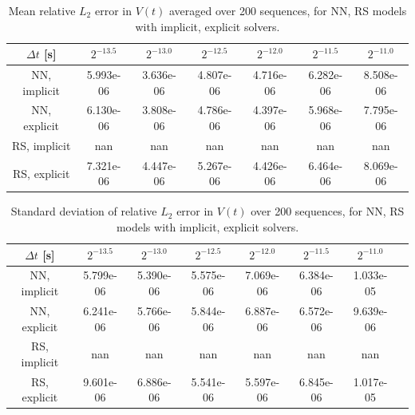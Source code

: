 \begin{table}[H]
    \centering
    \begin{tabular}{ccccccc}
        \hline
        $\Delta t$ [s] & $2^{-13.5}$ & $2^{-13.0}$ & $2^{-12.5}$ & $2^{-12.0}$ & $2^{-11.5}$ & $2^{-11.0}$ \\
        \hline
        NN, implicit & 5.993e-06 & 3.636e-06 & 4.807e-06 & 4.716e-06 & 6.282e-06 & 8.508e-06 \\
        NN, explicit & 6.130e-06 & 3.808e-06 & 4.786e-06 & 4.397e-06 & 5.968e-06 & 7.795e-06 \\
        RS, implicit & nan & nan & nan & nan & nan & nan \\
        RS, explicit & 7.321e-06 & 4.447e-06 & 5.267e-06 & 4.426e-06 & 6.464e-06 & 8.069e-06 \\
        \hline
    \end{tabular}
    \caption{Mean relative $L_2$ error in $V(t)$ averaged over 200 sequences, 
    for NN, RS models with implicit, explicit solvers.}
    \label{tab:MeanL2ErrorSpringSliderRsVsNNRespective}
\end{table}

\begin{table}[H]
    \centering
    \begin{tabular}{cccccccc}
        \hline
        $\Delta t$ [s] & $2^{-13.5}$ & $2^{-13.0}$ & $2^{-12.5}$ & $2^{-12.0}$ & $2^{-11.5}$ & $2^{-11.0}$ \\
        \hline
        NN, implicit & 5.799e-06 & 5.390e-06 & 5.575e-06 & 7.069e-06 & 6.384e-06 & 1.033e-05 \\
        NN, explicit & 6.241e-06 & 5.766e-06 & 5.844e-06 & 6.887e-06 & 6.572e-06 & 9.639e-06 \\
        RS, implicit & nan & nan & nan & nan & nan & nan \\
        RS, explicit & 9.601e-06 & 6.886e-06 & 5.541e-06 & 5.597e-06 & 6.845e-06 & 1.017e-05 \\
        \hline
    \end{tabular}
    \caption{Standard deviation of relative $L_2$ error in $V(t)$ over 200 sequences, 
    for NN, RS models with implicit, explicit solvers.}
    \label{tab:StdL2ErrorSpringSliderRsVsNNRespective}
\end{table}
